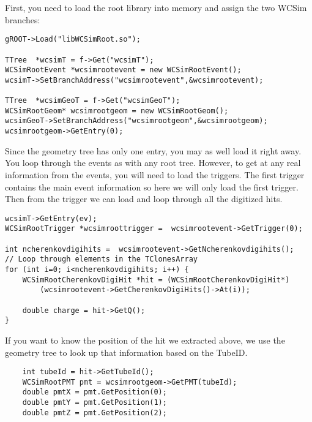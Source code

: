 First, you need to load the root library into memory and assign the two WCSim branches:
\begin{lstlisting}
gROOT->Load("libWCSimRoot.so");

TTree  *wcsimT = f->Get("wcsimT");
WCSimRootEvent *wcsimrootevent = new WCSimRootEvent();
wcsimT->SetBranchAddress("wcsimrootevent",&wcsimrootevent);

TTree  *wcsimGeoT = f->Get("wcsimGeoT");
WCSimRootGeom* wcsimrootgeom = new WCSimRootGeom();
wcsimGeoT->SetBranchAddress("wcsimrootgeom",&wcsimrootgeom);  
wcsimrootgeom->GetEntry(0);
\end{lstlisting}

Since the geometry tree has only one entry, you may as well load it right away.  You loop through the events as with any root tree.   However, to get at any real information from the events, you will need to load the triggers.  The first trigger contains the main event information so here we will only load the first trigger.  Then from the trigger we can load and loop through all the digitized hits.

\begin{lstlisting}
wcsimT->GetEntry(ev);
WCSimRootTrigger *wcsimroottrigger =  wcsimrootevent->GetTrigger(0);

int ncherenkovdigihits =  wcsimrootevent->GetNcherenkovdigihits(); 
// Loop through elements in the TClonesArray
for (int i=0; i<ncherenkovdigihits; i++) {
    WCSimRootCherenkovDigiHit *hit = (WCSimRootCherenkovDigiHit*)
        (wcsimrootevent->GetCherenkovDigiHits()->At(i));

    double charge = hit->GetQ();
}
\end{lstlisting}

If you want to know the position of the hit we extracted above, we use the geometry tree to look up that information based on the TubeID.

\begin{lstlisting}
    int tubeId = hit->GetTubeId();
    WCSimRootPMT pmt = wcsimrootgeom->GetPMT(tubeId);
    double pmtX = pmt.GetPosition(0);
    double pmtY = pmt.GetPosition(1);
    double pmtZ = pmt.GetPosition(2);
\end{lstlisting}









